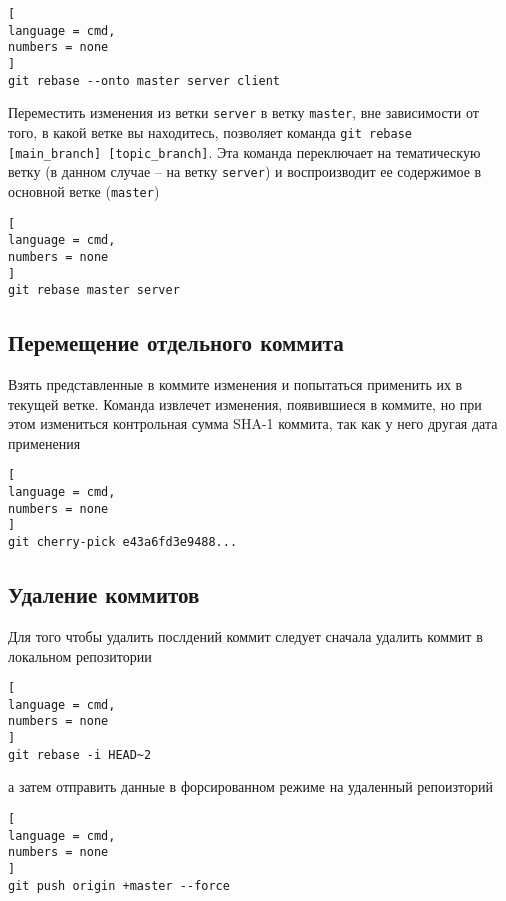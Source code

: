 \documentclass[%
	11pt,
	a4paper,
	utf8,
		]{article}
\begin{document}
\begin{lstlisting}[
language = cmd,
numbers = none
]
git rebase --onto master server client
\end{lstlisting}

Переместить изменения из ветки \texttt{server} в ветку \texttt{master}, вне зависимости от того, в какой ветке вы находитесь, позволяет команда \texttt{git rebase [main\_branch] [topic\_branch]}. Эта команда переключает на тематическую ветку (в данном случае -- на ветку \texttt{server}) и воспроизводит ее содержимое в основной ветке (\texttt{master})

\begin{lstlisting}[
language = cmd,
numbers = none
]
git rebase master server
\end{lstlisting}


\subsection{Перемещение отдельного коммита}

Взять представленные в коммите изменения и попытаться применить их в текущей ветке. Команда извлечет изменения, появившиеся в коммите, но при этом измениться контрольная сумма SHA-1 коммита, так как у него другая дата применения

\begin{lstlisting}[
language = cmd,
numbers = none
]
git cherry-pick e43a6fd3e9488...
\end{lstlisting}


\subsection{Удаление коммитов}

Для того чтобы удалить послдений коммит следует сначала удалить коммит в локальном репозитории

\begin{lstlisting}[
language = cmd,
numbers = none
]
git rebase -i HEAD~2
\end{lstlisting}
а затем отправить данные в форсированном режиме на удаленный репоизторий

\begin{lstlisting}[
language = cmd,
numbers = none
]
git push origin +master --force
\end{lstlisting}
\end{document}
